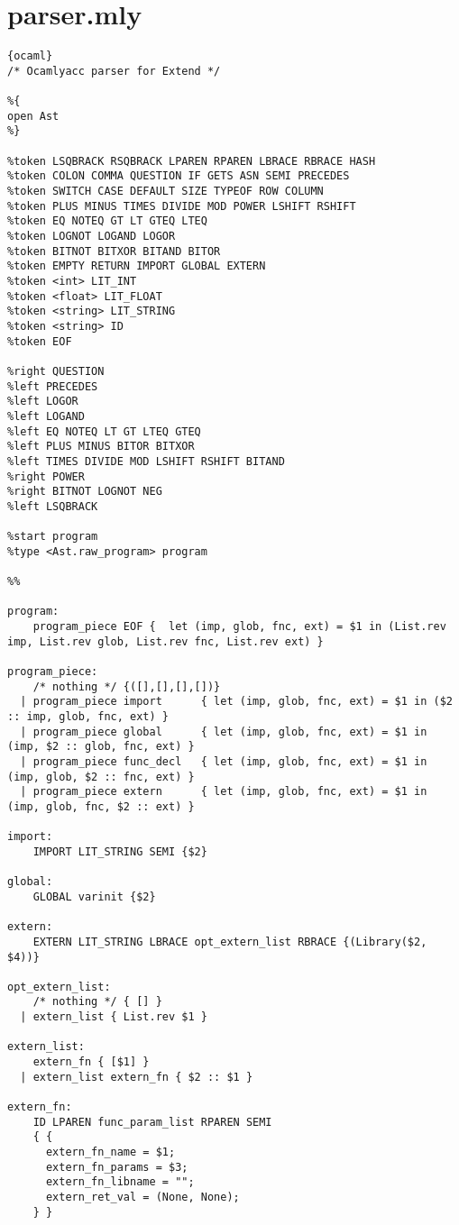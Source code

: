 \section{parser.mly}
\begin{lstlisting}{ocaml}
/* Ocamlyacc parser for Extend */

%{
open Ast
%}

%token LSQBRACK RSQBRACK LPAREN RPAREN LBRACE RBRACE HASH
%token COLON COMMA QUESTION IF GETS ASN SEMI PRECEDES
%token SWITCH CASE DEFAULT SIZE TYPEOF ROW COLUMN
%token PLUS MINUS TIMES DIVIDE MOD POWER LSHIFT RSHIFT
%token EQ NOTEQ GT LT GTEQ LTEQ
%token LOGNOT LOGAND LOGOR
%token BITNOT BITXOR BITAND BITOR
%token EMPTY RETURN IMPORT GLOBAL EXTERN
%token <int> LIT_INT
%token <float> LIT_FLOAT
%token <string> LIT_STRING
%token <string> ID
%token EOF

%right QUESTION
%left PRECEDES
%left LOGOR
%left LOGAND
%left EQ NOTEQ LT GT LTEQ GTEQ
%left PLUS MINUS BITOR BITXOR
%left TIMES DIVIDE MOD LSHIFT RSHIFT BITAND
%right POWER
%right BITNOT LOGNOT NEG
%left LSQBRACK

%start program
%type <Ast.raw_program> program

%%

program:
    program_piece EOF {  let (imp, glob, fnc, ext) = $1 in (List.rev imp, List.rev glob, List.rev fnc, List.rev ext) }

program_piece:
    /* nothing */ {([],[],[],[])}
  | program_piece import      { let (imp, glob, fnc, ext) = $1 in ($2 :: imp, glob, fnc, ext) }
  | program_piece global      { let (imp, glob, fnc, ext) = $1 in (imp, $2 :: glob, fnc, ext) }
  | program_piece func_decl   { let (imp, glob, fnc, ext) = $1 in (imp, glob, $2 :: fnc, ext) }
  | program_piece extern      { let (imp, glob, fnc, ext) = $1 in (imp, glob, fnc, $2 :: ext) }

import:
    IMPORT LIT_STRING SEMI {$2}

global:
    GLOBAL varinit {$2}

extern:
    EXTERN LIT_STRING LBRACE opt_extern_list RBRACE {(Library($2, $4))}

opt_extern_list:
    /* nothing */ { [] }
  | extern_list { List.rev $1 }

extern_list:
    extern_fn { [$1] }
  | extern_list extern_fn { $2 :: $1 }

extern_fn:
    ID LPAREN func_param_list RPAREN SEMI
    { {
      extern_fn_name = $1;
      extern_fn_params = $3;
      extern_fn_libname = "";
      extern_ret_val = (None, None);
    } }


\end{lstlisting}
